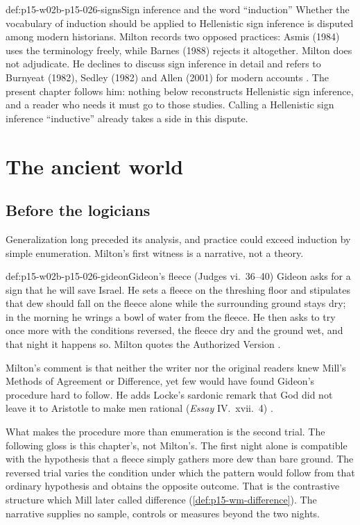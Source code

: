 \begin{hbwarning}{def:p15-w02b-p15-026-signs}{Sign inference and the word ``induction''}
Whether the vocabulary of induction should be applied to Hellenistic sign
inference is disputed among modern historians. Milton records two opposed
practices: Asmis (1984) uses the terminology freely, while Barnes (1988)
rejects it altogether. Milton does not adjudicate. He declines to discuss
sign inference in detail and refers to Burnyeat (1982), Sedley (1982) and
Allen (2001) for modern accounts
\cite[p.~1]{Milton2011InductionBeforeHume}. The present chapter follows
him: nothing below reconstructs Hellenistic sign inference, and a reader who
needs it must go to those studies. Calling a Hellenistic sign inference
``inductive'' already takes a side in this dispute.
\end{hbwarning}

\section{The ancient world}
\label{sec:p15-w02b-p15-026-ancient}

\subsection{Before the logicians}

Generalization long preceded its analysis, and practice could exceed
induction by simple enumeration. Milton's first witness is a narrative,
not a theory.

\begin{hbexample}{def:p15-w02b-p15-026-gideon}{Gideon's fleece (Judges vi.~36--40)}
Gideon asks for a sign that he will save Israel. He sets a fleece on the
threshing floor and stipulates that dew should fall on the fleece alone
while the surrounding ground stays dry; in the morning he wrings a bowl of
water from the fleece. He then asks to try once more with the conditions
reversed, the fleece dry and the ground wet, and that night it happens
so. Milton quotes the Authorized Version
\cite[pp.~1--2]{Milton2011InductionBeforeHume}.

Milton's comment is that neither the writer nor the original readers knew
Mill's Methods of Agreement or Difference, yet few would have found
Gideon's procedure hard to follow. He adds Locke's sardonic remark that God
did not leave it to Aristotle to make men rational (\emph{Essay}
IV.~xvii.~4) \cite[p.~2]{Milton2011InductionBeforeHume}.

What makes the procedure more than enumeration is the second trial.
The following gloss is this chapter's, not Milton's. The first night
alone is compatible with the hypothesis that a fleece simply gathers
more dew than bare ground. The reversed trial varies the condition
under which the pattern would follow from that ordinary hypothesis and
obtains the opposite outcome. That is the contrastive structure which
Mill later called difference (\cref{def:p15-wm-difference}). The
narrative supplies no sample, controls or measures beyond the two
nights.
\end{hbexample}

